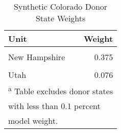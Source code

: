 \begin{table}[H]

\caption{\label{tab:unit_weight_table_colorado}Synthetic Colorado Donor State Weights}
\centering
\begin{tabular}[t]{lr}
\toprule
Unit & Weight\\
\midrule
\cellcolor{gray!6}{Arizona} & \cellcolor{gray!6}{0.454}\\
New Hampshire & 0.375\\
\cellcolor{gray!6}{District of Columbia} & \cellcolor{gray!6}{0.095}\\
Utah & 0.076\\
\bottomrule
\multicolumn{2}{l}{\textsuperscript{a} Table excludes donor states}\\
\multicolumn{2}{l}{with less than 0.1 percent}\\
\multicolumn{2}{l}{model weight.}\\
\end{tabular}
\end{table}
